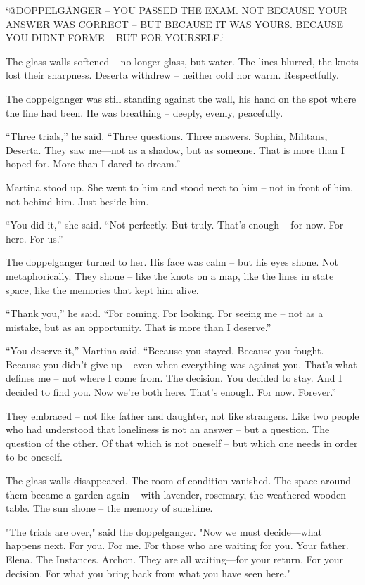\documentclass[
]{article}
\begin{document}
`@DOPPELGÄNGER -- YOU PASSED THE EXAM. NOT BECAUSE YOUR ANSWER WAS CORRECT -- BUT BECAUSE IT WAS YOURS. BECAUSE YOU DIDN\textquotesingle T FORME -- BUT FOR YOURSELF.`

The glass walls softened -- no longer glass, but water. The lines blurred, the knots lost their sharpness. Deserta withdrew -- neither cold nor warm. Respectfully.

The doppelganger was still standing against the wall, his hand on the spot where the line had been. He was breathing -- deeply, evenly, peacefully.

``Three trials,'' he said. ``Three questions. Three answers. Sophia, Militans, Deserta. They saw me---not as a shadow, but as someone. That is more than I hoped for. More than I dared to dream.''

Martina stood up. She went to him and stood next to him -- not in front of him, not behind him. Just beside him.

``You did it,'' she said. ``Not perfectly. But truly. That's enough -- for now. For here. For us.''

The doppelganger turned to her. His face was calm -- but his eyes shone. Not metaphorically. They shone -- like the knots on a map, like the lines in state space, like the memories that kept him alive.

``Thank you,'' he said. ``For coming. For looking. For seeing me -- not as a mistake, but as an opportunity. That is more than I deserve.''

``You deserve it,'' Martina said. ``Because you stayed. Because you fought. Because you didn't give up -- even when everything was against you. That's what defines me -- not where I come from. The decision. You decided to stay. And I decided to find you. Now we're both here. That's enough. For now. Forever.''

They embraced -- not like father and daughter, not like strangers. Like two people who had understood that loneliness is not an answer -- but a question. The question of the other. Of that which is not oneself -- but which one needs in order to be oneself.

The glass walls disappeared. The room of condition vanished. The space around them became a garden again -- with lavender, rosemary, the weathered wooden table. The sun shone -- the memory of sunshine.

"The trials are over," said the doppelganger. "Now we must decide---what happens next. For you. For me. For those who are waiting for you. Your father. Elena. The Instances. Archon. They are all waiting---for your return. For your decision. For what you bring back from what you have seen here."
\end{document}
